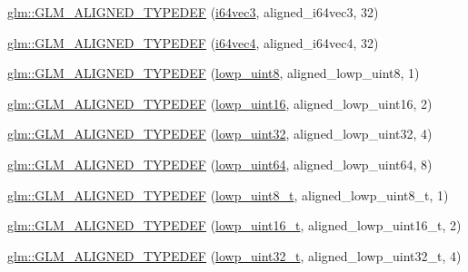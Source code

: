 \begin{DoxyCompactItemize}
\item 
\hyperlink{group__gtx__type__aligned_gad77c317b7d942322cd5be4c8127b3187}{glm\+::\+G\+L\+M\+\_\+\+A\+L\+I\+G\+N\+E\+D\+\_\+\+T\+Y\+P\+E\+D\+EF} (\hyperlink{group__gtc__type__precision_gad7aa290b2d88847999c1305ed5c82669}{i64vec3}, aligned\+\_\+i64vec3, 32)
\item 
\hyperlink{group__gtx__type__aligned_ga716f8ea809bdb11b5b542d8b71aeb04f}{glm\+::\+G\+L\+M\+\_\+\+A\+L\+I\+G\+N\+E\+D\+\_\+\+T\+Y\+P\+E\+D\+EF} (\hyperlink{group__gtc__type__precision_ga77db970d924dd55ac93e00391ad4a10e}{i64vec4}, aligned\+\_\+i64vec4, 32)
\item 
\hyperlink{group__gtx__type__aligned_gad46f8e9082d5878b1bc04f9c1471cdaa}{glm\+::\+G\+L\+M\+\_\+\+A\+L\+I\+G\+N\+E\+D\+\_\+\+T\+Y\+P\+E\+D\+EF} (\hyperlink{group__gtc__type__precision_ga4d9dc08b7b248a386dfe9afd00fc6b1e}{lowp\+\_\+uint8}, aligned\+\_\+lowp\+\_\+uint8, 1)
\item 
\hyperlink{group__gtx__type__aligned_ga1246094581af624aca6c7499aaabf801}{glm\+::\+G\+L\+M\+\_\+\+A\+L\+I\+G\+N\+E\+D\+\_\+\+T\+Y\+P\+E\+D\+EF} (\hyperlink{group__gtc__type__precision_ga9b8409887319f62f06e664f6ca121b9d}{lowp\+\_\+uint16}, aligned\+\_\+lowp\+\_\+uint16, 2)
\item 
\hyperlink{group__gtx__type__aligned_ga7a5009a1d0196bbf21dd7518f61f0249}{glm\+::\+G\+L\+M\+\_\+\+A\+L\+I\+G\+N\+E\+D\+\_\+\+T\+Y\+P\+E\+D\+EF} (\hyperlink{group__gtc__type__precision_gaf11e85af414720b4cd12bd57b3a81e68}{lowp\+\_\+uint32}, aligned\+\_\+lowp\+\_\+uint32, 4)
\item 
\hyperlink{group__gtx__type__aligned_ga45213fd18b3bb1df391671afefe4d1e7}{glm\+::\+G\+L\+M\+\_\+\+A\+L\+I\+G\+N\+E\+D\+\_\+\+T\+Y\+P\+E\+D\+EF} (\hyperlink{group__gtc__type__precision_gacf666a9d9b309c4615c7a4f2ab0be289}{lowp\+\_\+uint64}, aligned\+\_\+lowp\+\_\+uint64, 8)
\item 
\hyperlink{group__gtx__type__aligned_ga0ba26b4e3fd9ecbc25358efd68d8a4ca}{glm\+::\+G\+L\+M\+\_\+\+A\+L\+I\+G\+N\+E\+D\+\_\+\+T\+Y\+P\+E\+D\+EF} (\hyperlink{group__gtc__type__precision_ga0910ef24195d1b8b26e34d73148c0c45}{lowp\+\_\+uint8\+\_\+t}, aligned\+\_\+lowp\+\_\+uint8\+\_\+t, 1)
\item 
\hyperlink{group__gtx__type__aligned_gaf2b58f5fb6d4ec8ce7b76221d3af43e1}{glm\+::\+G\+L\+M\+\_\+\+A\+L\+I\+G\+N\+E\+D\+\_\+\+T\+Y\+P\+E\+D\+EF} (\hyperlink{group__gtc__type__precision_ga9a71176a4e5bc61951f9e9197d9c80e1}{lowp\+\_\+uint16\+\_\+t}, aligned\+\_\+lowp\+\_\+uint16\+\_\+t, 2)
\item 
\hyperlink{group__gtx__type__aligned_gadc246401847dcba155f0699425e49dcd}{glm\+::\+G\+L\+M\+\_\+\+A\+L\+I\+G\+N\+E\+D\+\_\+\+T\+Y\+P\+E\+D\+EF} (\hyperlink{group__gtc__type__precision_ga9f8cb602a358e1f48bda2682cf051f0c}{lowp\+\_\+uint32\+\_\+t}, aligned\+\_\+lowp\+\_\+uint32\+\_\+t, 4)

\end{DoxyCompactItemize}
